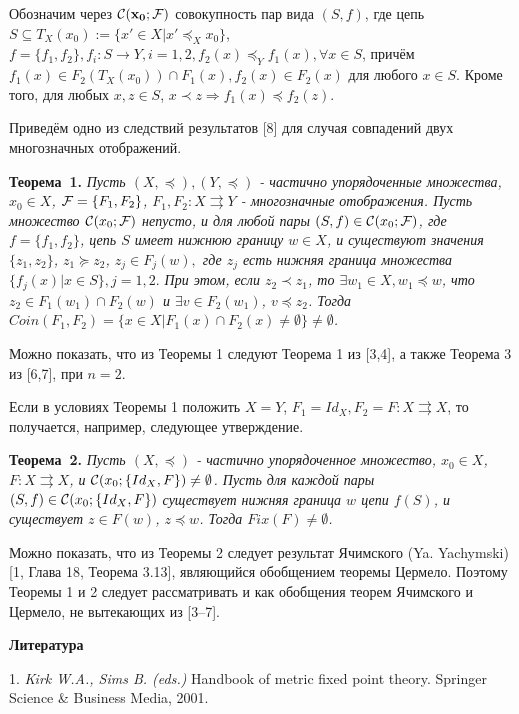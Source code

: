 Обозначим через  ${\bf {\cal C}(x_{0}; {\cal F})}$ совокупность пар вида $(S,f)$, где цепь
$S\subseteq T_{X}(x_{0}):=\{x'\in X |x'\preceq_{X} x_{0}\}$,
$f=\{f_{1}, f_{2}\}, f_{i}: S\to Y,  i=1,2, f_{2}(x)\preceq_{Y} f_{1}(x), \forall x\in S$, причём $f_{1}(x) \in  F_{2}(T_X(x_0))\cap F_{1}(x), f_2(x) \in F_2(x)$ для любого $x\in S$. Кроме того, для любых $x,z\in S$, $x\prec z\Longrightarrow f_{1}(x)\preceq f_{2}(z).$

Приведём  одно из следствий  результатов [8] для случая совпадений двух многозначных  отображений.

\textbf{Теорема~1.} {\it  Пусть $(X,\preceq), (Y,\preceq)$  - частично упорядоченные множества, $x_{0}\in X$, ${\cal F}=\{F_{1},F_{2}\}$,  $F_{1},F_{2}: X\rightrightarrows Y$ - многозначные отображения. Пусть множество ${\cal C}(x_{0}; {\cal F})$ непусто, и для любой пары $(S,f)\in {\cal C}(x_{0}; {\cal F})$, где $f=\{f_{1},f_{2}\}$, цепь $S$ имеет нижнюю границу $w\in X$, и существуют значения  $\{z_{1},z_{2}\}$, $z_{1}\succeq z_{2}$, $z_{j}\in F_{j}(w),$  где $z_{j}$ есть нижняя граница множества $\{f_{j}(x)| x\in S\}, j=1,2.$ При этом, если $z_{2}\prec z_{1}$, то  $\exists w_{1}\in X, w_{1}\preceq w$, что   $z_{2}\in F_{1}(w_{1})\cap F_{2}(w)$ и  $\exists v\in F_{2}(w_{1})$, $v\preceq z_{2}$. Тогда   $Coin(F_{1},F_{2})=\{x\in X| F_{1}(x)\cap F_{2}(x)\ne \emptyset\}\ne \emptyset$.}

Можно показать, что из Теоремы 1 следуют Теорема 1 из [3,4], а также Теорема 3 из [6,7], при $n=2$.

Если в условиях Теоремы 1 положить  $X=Y$, $F_{1}=Id_{X}, F_{2}=F: X\rightrightarrows X$, то  получается, например, следующее утверждение.

\textbf{Теорема~2.} {\it Пусть $(X,\preceq)$  - частично упорядоченное множество, $x_{0}\in X$,   $F: X\rightrightarrows X$, и ${\cal C}(x_{0}; \{Id_{X}, F\})\ne \emptyset$. Пусть для каждой пары $(S,f)\in {\cal C}(x_{0}; \{Id_{X}, F\})$ существует нижняя граница $w$  цепи $f(S)$, и существует $z\in F(w)$, $z\preceq w$. Тогда $Fix(F)\ne \emptyset$.}

Можно показать, что из Теоремы 2 следует результат Ячимского (Ya. Yachymski) [1, Глава 18, Теорема 3.13], являющийся обобщением теоремы Цермело. Поэтому Теоремы 1 и 2 следует рассматривать и как обобщения  теорем Ячимского и  Цермело, не вытекающих из [3--7].



\smallskip \centerline{\bf Литература}\nopagebreak


1. {\it Kirk W.A., Sims B. (eds.)} Handbook of metric fixed point theory. Springer Science \& Business Media,  2001.

